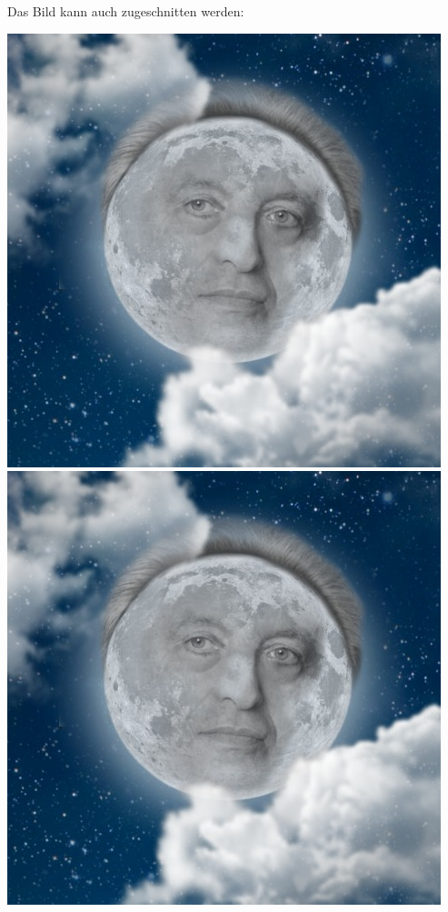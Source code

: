 \documentclass[a4paper, 10pt,onecolumn]{scrartcl}
\begin{document}
Das Bild kann auch zugeschnitten werden:

\begin{center}
	\includegraphics[clip, trim=7cm 7cm 5cm 6cm]{lotze.jpg}
	\includegraphics[clip, trim=7cm 7.5cm 6cm 7.5cm]{lotze.jpg}
\end{center}
\newpage
\end{document}
